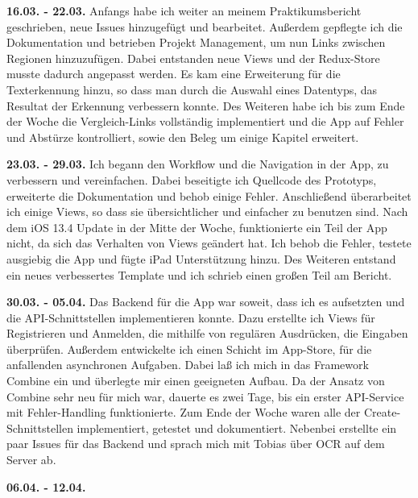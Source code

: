 \documentclass[nomenclature, oneside, 150]{HSMW-Thesis}
\begin{document}
	\textbf{16.03. - 22.03.} 
	Anfangs habe ich weiter an meinem Praktikumsbericht geschrieben, neue Issues hinzugefügt und bearbeitet. Außerdem gepflegte ich die Dokumentation und betrieben Projekt Management, um nun Links zwischen Regionen hinzuzufügen. Dabei entstanden neue Views und der Redux-Store musste dadurch angepasst werden. Es kam eine Erweiterung für die Texterkennung hinzu, so dass man durch die Auswahl eines Datentyps, das Resultat der Erkennung verbessern konnte. Des Weiteren habe ich bis zum Ende der Woche die Vergleich-Links vollständig implementiert und die App auf Fehler und Abstürze kontrolliert, sowie den Beleg um einige Kapitel erweitert.
	
	\textbf{23.03. - 29.03.} 
	Ich begann den Workflow und die Navigation in der App, zu verbessern und vereinfachen. Dabei beseitigte ich Quellcode des Prototyps, erweiterte die Dokumentation und behob einige Fehler. Anschließend überarbeitet ich einige Views, so dass sie übersichtlicher und einfacher zu benutzen sind. Nach dem iOS 13.4 Update in der Mitte der Woche, funktionierte ein Teil der App nicht, da sich das Verhalten von Views geändert hat. Ich behob die Fehler, testete ausgiebig die App und fügte iPad Unterstützung hinzu. Des Weiteren entstand ein neues verbessertes Template und ich schrieb einen großen Teil am Bericht.
	
	\textbf{30.03. - 05.04.} 
	Das Backend für die App war soweit, dass ich es aufsetzten und die API-Schnittstellen implementieren konnte. Dazu erstellte ich Views für Registrieren und Anmelden, die mithilfe von regulären Ausdrücken, die Eingaben überprüfen. Außerdem entwickelte ich einen Schicht im App-Store, für die anfallenden asynchronen Aufgaben. Dabei laß ich mich in das Framework Combine ein und überlegte mir einen geeigneten Aufbau. Da der Ansatz von Combine sehr neu für mich war, dauerte es zwei Tage, bis ein erster API-Service mit Fehler-Handling funktionierte. Zum Ende der Woche waren alle der Create-Schnittstellen implementiert, getestet und dokumentiert. Nebenbei erstellte ein paar Issues für das Backend und sprach mich mit Tobias über OCR auf dem Server ab.
	
	\textbf{06.04. - 12.04.}



\end{document}
